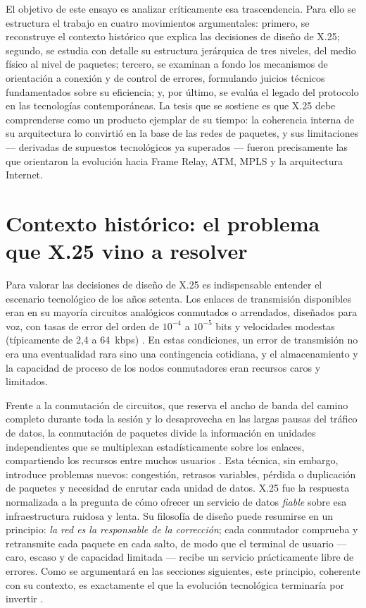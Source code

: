 \documentclass[12pt,a4paper]{article}
\begin{document}
El objetivo de este ensayo es analizar críticamente esa trascendencia. Para ello se estructura el trabajo en cuatro movimientos argumentales: primero, se reconstruye el contexto histórico que explica las decisiones de diseño de X.25; segundo, se estudia con detalle su estructura jerárquica de tres niveles, del medio físico al nivel de paquetes; tercero, se examinan a fondo los mecanismos de orientación a conexión y de control de errores, formulando juicios técnicos fundamentados sobre su eficiencia; y, por último, se evalúa el legado del protocolo en las tecnologías contemporáneas. La tesis que se sostiene es que X.25 debe comprenderse como un producto ejemplar de su tiempo: la coherencia interna de su arquitectura lo convirtió en la base de las redes de paquetes, y sus limitaciones --- derivadas de supuestos tecnológicos ya superados --- fueron precisamente las que orientaron la evolución hacia Frame Relay, ATM, MPLS y la arquitectura Internet.

\section{Contexto histórico: el problema que X.25 vino a resolver}

Para valorar las decisiones de diseño de X.25 es indispensable entender el escenario tecnológico de los años setenta. Los enlaces de transmisión disponibles eran en su mayoría circuitos analógicos conmutados o arrendados, diseñados para voz, con tasas de error del orden de $10^{-4}$ a $10^{-5}$ bits y velocidades modestas (típicamente de 2{,}4 a 64~kbps) \cite{schwartz1987, stallings2004}. En estas condiciones, un error de transmisión no era una eventualidad rara sino una contingencia cotidiana, y el almacenamiento y la capacidad de proceso de los nodos conmutadores eran recursos caros y limitados.

Frente a la conmutación de circuitos, que reserva el ancho de banda del camino completo durante toda la sesión y lo desaprovecha en las largas pausas del tráfico de datos, la conmutación de paquetes divide la información en unidades independientes que se multiplexan estadísticamente sobre los enlaces, compartiendo los recursos entre muchos usuarios \cite{tanenbaum2012, duato2016}. Esta técnica, sin embargo, introduce problemas nuevos: congestión, retrasos variables, pérdida o duplicación de paquetes y necesidad de enrutar cada unidad de datos. X.25 fue la respuesta normalizada a la pregunta de cómo ofrecer un servicio de datos \emph{fiable} sobre esa infraestructura ruidosa y lenta. Su filosofía de diseño puede resumirse en un principio: \emph{la red es la responsable de la corrección}; cada conmutador comprueba y retransmite cada paquete en cada salto, de modo que el terminal de usuario --- caro, escaso y de capacidad limitada --- recibe un servicio prácticamente libre de errores. Como se argumentará en las secciones siguientes, este principio, coherente con su contexto, es exactamente el que la evolución tecnológica terminaría por invertir \cite{saltzer1984}.
\end{document}
